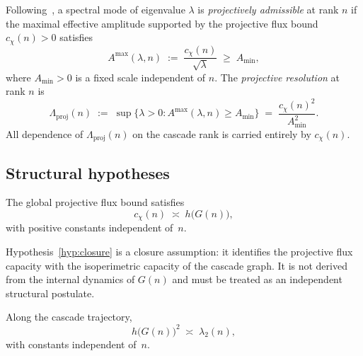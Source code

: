     Following~\cite{Beau2026a1, Beau2026a4}, a spectral mode
    of eigenvalue $\lambda$ is \emph{projectively admissible} at rank $n$ if the
    maximal effective amplitude supported by the projective flux bound
    $c_\chi(n) > 0$ satisfies
    \begin{equation}
      \label{eq:admissibility-envelope}
      A^{\max}(\lambda, n)
      \;:=\; \frac{c_\chi(n)}{\sqrt{\lambda}}
      \;\geq\; A_{\min},
    \end{equation}
    where $A_{\min} > 0$ is a fixed scale independent of $n$.
    The \emph{projective resolution} at rank $n$ is
    \begin{equation}
      \label{eq:Lambdaproj-def}
      \Lambda_{\mathrm{proj}}(n)
      \;:=\;
      \sup\bigl\{\lambda > 0 : A^{\max}(\lambda,n) \geq A_{\min}\bigr\}
      \;=\; \frac{c_\chi(n)^2}{A_{\min}^2}.
    \end{equation}
    All dependence of $\Lambda_{\mathrm{proj}}(n)$ on the cascade rank is
    carried entirely by $c_\chi(n)$.

  \subsection{Structural hypotheses}
    \label{sec:framework:hypotheses}

    \begin{hypothesis}
      \label{hyp:closure}
      The global projective flux bound satisfies
      \begin{equation}
        \label{eq:cchi-h}
        c_\chi(n) \;\asymp\; h\bigl(G(n)\bigr),
      \end{equation}
      with positive constants independent of~$n$.
    \end{hypothesis}

    \noindent
    Hypothesis~\ref{hyp:closure} is a closure assumption: it identifies the
    projective flux capacity with the isoperimetric capacity of the cascade graph.
    It is not derived from the internal dynamics of $G(n)$ and must be treated as
    an independent structural postulate.

    \begin{hypothesis}
      \label{hyp:saturation}
      Along the cascade trajectory,
      \begin{equation}
        \label{eq:saturation}
        h\bigl(G(n)\bigr)^2 \;\asymp\; \lambda_2(n),
      \end{equation}
      with constants independent of~$n$.
    \end{hypothesis}

